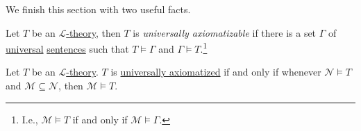 We finish this section with two useful facts.

\begin{definition}\label{def:universally-axiomatizable}
	Let \(T\) be an \hyperref[def:theory]{\(\mathcal{L} \)-theory}, then \(T\) is \emph{universally axiomatizable} if there is a set \(\Gamma \) of \hyperref[not:universal]{universal} \hyperref[def:sentence]{sentences} such that \(T \models \Gamma \) and \(\Gamma \models T\).\footnote{I.e., \(\mathcal{M} \models T\) if and only if \(\mathcal{M} \models \Gamma \).}
\end{definition}

\begin{theorem}
	Let \(T\) be an \hyperref[def:theory]{\(\mathcal{L} \)-theory}. \(T\) is \hyperref[def:universally-axiomatizable]{universally axiomatized} if and only if whenever \(\mathcal{N} \models T\) and \(\mathcal{M} \subseteq \mathcal{N} \), then \(\mathcal{M} \models T\).
\end{theorem}
